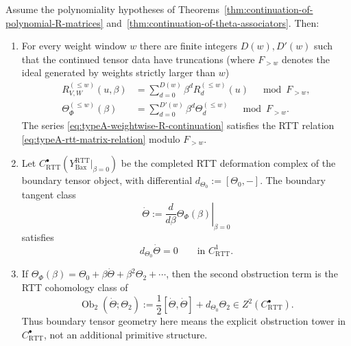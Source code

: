 \begin{theorem}
Assume the polynomiality hypotheses of
Theorems~\ref{thm:continuation-of-polynomial-R-matrices}
and~\ref{thm:continuation-of-theta-associators}. Then:
\begin{enumerate}
\item For every weight window $w$ there are finite integers
$D(w),D'(w)$ such that the continued tensor data have truncations
\textup{(where $F_{>w}$ denotes the ideal generated by weights
strictly larger than $w$)}
\begin{align}
\label{eq:typeA-weightwise-R-continuation}
R_{V,W}^{(\le w)}(u,\beta)
&=
\sum_{d=0}^{D(w)}\beta^d R_d^{(\le w)}(u)
\quad \bmod F_{>w},\\
\label{eq:typeA-weightwise-theta-continuation}
\Theta_{\Phi}^{(\le w)}(\beta)
&=
\sum_{d=0}^{D'(w)}\beta^d\Theta_d^{(\le w)}
\quad \bmod F_{>w}.
\end{align}
The series \eqref{eq:typeA-weightwise-R-continuation} satisfies the RTT
relation \eqref{eq:typeA-rtt-matrix-relation} modulo $F_{>w}$.
\item Let
$C^\bullet_{\mathrm{RTT}}(Y_{\mathrm{Bax}}^{\mathrm{RTT}}|_{\beta=0})$
be the completed RTT deformation complex of the boundary tensor object,
with differential $d_{\Theta_0}:=[\Theta_0,-]$. The boundary tangent
class
\begin{equation}
\label{eq:typeA-boundary-dot-theta}
\dot\Theta
:=
\left.\frac{d}{d\beta}\Theta_{\Phi}(\beta)\right|_{\beta=0}
\end{equation}
satisfies
\begin{equation}
\label{eq:typeA-boundary-tangent-cocycle}
d_{\Theta_0}\dot\Theta=0
\qquad
\text{in } C^1_{\mathrm{RTT}}.
\end{equation}
\item If
$\Theta_{\Phi}(\beta)=\Theta_0+\beta\dot\Theta+\beta^2\Theta_2+\cdots$,
then the second obstruction term is the RTT cohomology class of
\begin{equation}
\label{eq:typeA-boundary-second-obstruction}
\operatorname{Ob}_2(\dot\Theta;\Theta_2)
:=
\frac12[\dot\Theta,\dot\Theta]+d_{\Theta_0}\Theta_2
\in Z^2(C^\bullet_{\mathrm{RTT}}).
\end{equation}
Thus boundary tensor geometry here means the explicit obstruction tower
in $C^\bullet_{\mathrm{RTT}}$, not an additional primitive structure.
\end{enumerate}
\end{theorem}

